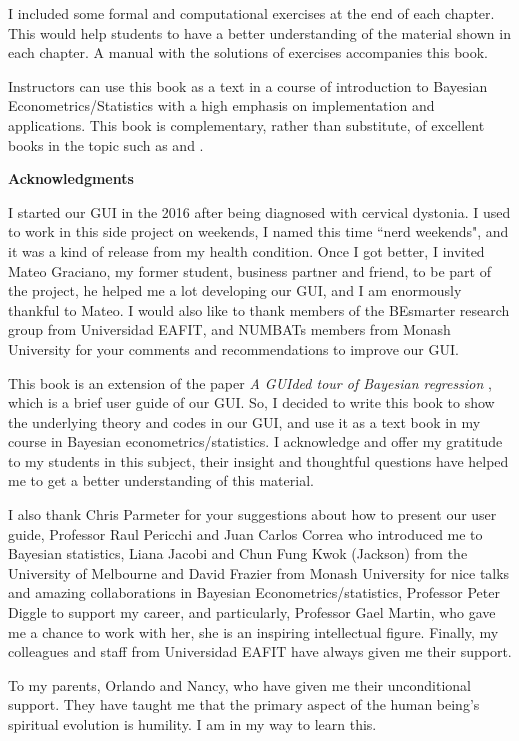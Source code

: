 I included some formal and computational exercises at the end of each chapter. This would help students to have a better understanding of the material shown in each chapter. A manual with the solutions of exercises accompanies this book.

Instructors can use this book as a text in a course of introduction to Bayesian Econometrics/Statistics with a high emphasis on implementation and applications. This book is complementary, rather than substitute, of excellent books in the topic such as \cite{gelman2021bayesian,chan2019bayesian,rossi2012bayesian,greenberg2012introduction, geweke2005contemporary, lancaster2004introduction} and \cite{koop2003bayesian}.

\textbf{Acknowledgments}

I started our GUI in the 2016 after being diagnosed with cervical dystonia. I used to work in this side project on weekends, I named this time ``nerd weekends", and it was a kind of release from my health condition. Once I got better, I invited Mateo Graciano, my former student, business partner and friend, to be part of the project, he helped me a lot developing our GUI, and I am enormously thankful to Mateo. I would also like to thank members of the BEsmarter research group from Universidad EAFIT, and NUMBATs members from Monash University for your comments and recommendations to improve our GUI.

This book is an extension of the paper \textit{A GUIded tour of Bayesian regression} \cite{Ramirez2020}, which is a brief user guide of our GUI. So, I decided to write this book to show the underlying theory and codes in our GUI, and use it as a text book in my course in Bayesian econometrics/statistics. I acknowledge and offer my gratitude to my students in this subject, their insight and thoughtful questions have helped me to get a better understanding of this material.   

I also thank Chris Parmeter for your suggestions about how to present our user guide, Professor Raul Pericchi and Juan Carlos Correa who introduced me to Bayesian statistics, Liana Jacobi and Chun Fung Kwok (Jackson) from the University of Melbourne and David Frazier from Monash University for nice talks and amazing collaborations in Bayesian Econometrics/statistics, Professor Peter Diggle to support my career, and particularly, Professor Gael Martin, who gave me a chance to work with her, she is an inspiring intellectual figure. Finally, my colleagues and staff from Universidad EAFIT have always given me their support.

To my parents, Orlando and Nancy, who have given me their unconditional support. They have taught me that the primary aspect of the human being's spiritual evolution is humility. I am in my way to learn this.


